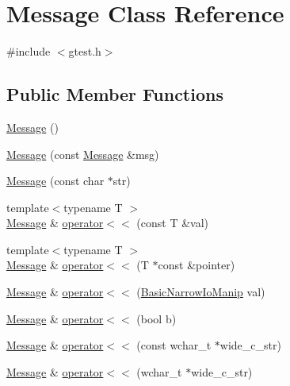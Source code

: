 \hypertarget{classtesting_1_1Message}{\section{\-Message \-Class \-Reference}
\label{d3/d98/classtesting_1_1Message}
}


{\ttfamily \#include $<$gtest.\-h$>$}

\subsection*{\-Public \-Member \-Functions}
\begin{DoxyCompactItemize}
\item 
\hyperlink{classtesting_1_1Message_af1991e0448f9277f0939d142e4aa2c94}{\-Message} ()
\item 
\hyperlink{classtesting_1_1Message_a88a351ea6cb0a42238744a6565ab665f}{\-Message} (const \hyperlink{classtesting_1_1Message}{\-Message} \&msg)
\item 
\hyperlink{classtesting_1_1Message_ad39663bd5560bdd7033a30d085afd759}{\-Message} (const char $\ast$str)
\item 
{\footnotesize template$<$typename T $>$ }\\\hyperlink{classtesting_1_1Message}{\-Message} \& \hyperlink{classtesting_1_1Message_a173f6d370f2730877bbf104ceb93f461}{operator$<$$<$} (const \-T \&val)
\item 
{\footnotesize template$<$typename T $>$ }\\\hyperlink{classtesting_1_1Message}{\-Message} \& \hyperlink{classtesting_1_1Message_ae41772c43713f4bbc704c8b3f0648839}{operator$<$$<$} (\-T $\ast$const \&pointer)
\item 
\hyperlink{classtesting_1_1Message}{\-Message} \& \hyperlink{classtesting_1_1Message_a2cf5e79015eff3c525bad5758bb7c873}{operator$<$$<$} (\hyperlink{classtesting_1_1Message_ae41100e7f6db1696cd6282c56c1528b3}{\-Basic\-Narrow\-Io\-Manip} val)
\item 
\hyperlink{classtesting_1_1Message}{\-Message} \& \hyperlink{classtesting_1_1Message_a905ea03f1daecb48aa6e89e7f2c61673}{operator$<$$<$} (bool b)
\item 
\hyperlink{classtesting_1_1Message}{\-Message} \& \hyperlink{classtesting_1_1Message_ae6963b96f86950ded481a92a81e19ea0}{operator$<$$<$} (const wchar\-\_\-t $\ast$wide\-\_\-c\-\_\-str)
\item 
\hyperlink{classtesting_1_1Message}{\-Message} \& \hyperlink{classtesting_1_1Message_a1ce1e8502319779d5a2778214d460f3d}{operator$<$$<$} (wchar\-\_\-t $\ast$wide\-\_\-c\-\_\-str)

\end{DoxyCompactItemize}
